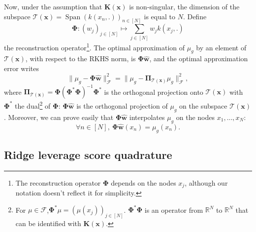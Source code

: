\documentclass[twoside,11pt]{book}
\DeclareMathOperator{\Span}{\mathrm{Span}}
\begin{document}
Now, under the assumption that $\bm{K}(\bm{x})$ is non-singular, the dimension of the subspace $\mathcal{T}(\bm{x}) = \Span (k(x_{n},.))_{n \in [N]}$ is equal to $N$. Define 
\begin{equation}
	\bm{\Phi}:(w_{j})_{j \in [N]} \mapsto \sum_{j \in [N]} w_{j} k(x_{j},.)
\end{equation}
 the reconstruction operator\footnote{The reconstruction operator $\bm{\Phi}$ depends on the nodes $x_{j}$, although our notation doesn't reflect it for simplicity.}. The optimal approximation of $\mu_{g}$ by an element of $\mathcal{T}(\bm{x})$, with respect to the RKHS norm, is $\bm{\Phi}\hat{\bm{w}}$, and the optimal approximation error writes
\begin{equation}
\|\mu_{g} - \bm{\Phi}\hat{\bm{w}}\|^{2}_{\mathcal{F}} =\|\mu_{g} - \bm{\Pi}_{\mathcal{T}(\bm{x})}\mu_{g}\|^{2}_{\mathcal{F}},\label{e:finalTool}
\end{equation}
where $\bm{\Pi}_{\mathcal{T}(\bm{x})} = \bm{\Phi}(\bm{\Phi}^{*}\bm{\Phi})^{-1}\bm{\Phi}^{*}$ is the orthogonal projection onto $\mathcal{T}(\bm{x})$ with $\bm{\Phi}^{*}$ the dual\footnote{For $\mu \in \mathcal{F}$,$\bm{\Phi}^{*}\mu = (\mu(x_{j}))_{j \in [N]}$. $\bm{\Phi}^{*}\bm{\Phi}$ is an operator from $\mathbb{R}^{N}$ to $\mathbb{R}^{N}$ that can be identified with $\bm{K}(\bm{x})$.} of $\bm{\Phi}$: $\bm{\Phi}\hat{\bm{w}}$ is the orthogonal projection of $\mu_{g}$ on the subspace $\mathcal{T}(\bm{x})$. Moreover, we can prove easily that $\bm{\Phi}\hat{\bm{w}}$ interpolates $\mu_{g}$ on the nodes $x_{1}, \dots, x_{N}$:
\begin{equation}
\forall n \in [N], \:\bm{\Phi}\hat{\bm{w}}(x_{n}) = \mu_{g}(x_{n}).
\end{equation}


\subsection{Ridge leverage score quadrature}
\label{subsec:okq_algebraic_paradigm}
\end{document}
